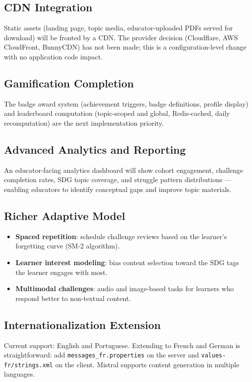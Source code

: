 \subsection{CDN Integration}
Static assets (landing page, topic media, educator-uploaded PDFs served for download) will be fronted by a CDN. The provider decision (Cloudflare, AWS CloudFront, BunnyCDN) has not been made; this is a configuration-level change with no application code impact.

\subsection{Gamification Completion}
The badge award system (achievement triggers, badge definitions, profile display) and leaderboard computation (topic-scoped and global, Redis-cached, daily recomputation) are the next implementation priority.

\subsection{Advanced Analytics and Reporting}
An educator-facing analytics dashboard will show cohort engagement, challenge completion rates, SDG topic coverage, and struggle pattern distributions — enabling educators to identify conceptual gaps and improve topic materials.

\subsection{Richer Adaptive Model}
\begin{itemize}
    \item \textbf{Spaced repetition}: schedule challenge reviews based on the learner's forgetting curve (SM-2 algorithm).
    \item \textbf{Learner interest modeling}: bias content selection toward the SDG tags the learner engages with most.
    \item \textbf{Multimodal challenges}: audio and image-based tasks for learners who respond better to non-textual content.
\end{itemize}

\subsection{Internationalization Extension}
Current support: English and Portuguese. Extending to French and German is straightforward: add \texttt{messages\_fr.properties} on the server and \texttt{values-fr/strings.xml} on the client. Mistral supports content generation in multiple languages.

